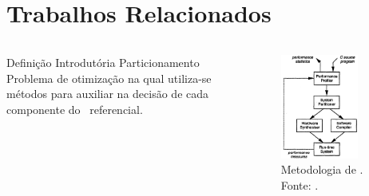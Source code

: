 \section{Trabalhos Relacionados}
   
   \begin{frame} \vspace{-1em}
      \begin{columns}
         \begin{column}{0.4\textwidth}
            \begin{block}{Definição Introdutória Particionamento \cite{Arato2005}}
               Problema de otimização na qual utiliza-se métodos para auxiliar na decisão de cada componente do \design\ referencial. 
            \end{block}
         \end{column}
         \begin{column}{0.6\textwidth}
            
            \begin{figure}[h] \centering
               \includegraphics[width=0.8\textwidth]{img/rt-edwards_method.png}
               \caption{Metodologia de \codesign. Fonte: \cite{Edwards1994}.}
               \label{fig:tr-edwards_method}
            \end{figure}
         \end{column}
      \end{columns}   
   
   \end{frame}
   
